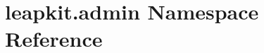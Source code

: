 \hypertarget{namespaceleapkit_1_1admin}{\section{leapkit.\-admin Namespace Reference}
\label{namespaceleapkit_1_1admin}
}
